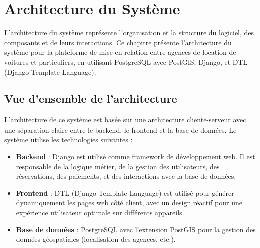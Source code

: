 \chapter{Architecture du Système}
\label{chap:Architecture}

L'architecture du système représente l'organisation et la structure du logiciel, des composants et de leurs interactions. Ce chapitre présente l'architecture du système pour la plateforme de mise en relation entre agences de location de voitures et particuliers, en utilisant PostgreSQL avec PostGIS, Django, et DTL (Django Template Language). 

\section{Vue d'ensemble de l'architecture}
L'architecture de ce système est basée sur une architecture cliente-serveur avec une séparation claire entre le backend, le frontend et la base de données. Le système utilise les technologies suivantes :

\begin{itemize}
    \item \textbf{Backend} : Django est utilisé comme framework de développement web. Il est responsable de la logique métier, de la gestion des utilisateurs, des réservations, des paiements, et des interactions avec la base de données.
    \item \textbf{Frontend} : DTL (Django Template Language) est utilisé pour générer dynamiquement les pages web côté client, avec un design réactif pour une expérience utilisateur optimale sur différents appareils.
    \item \textbf{Base de données} : PostgreSQL avec l'extension PostGIS pour la gestion des données géospatiales (localisation des agences, etc.).
\end{itemize}

